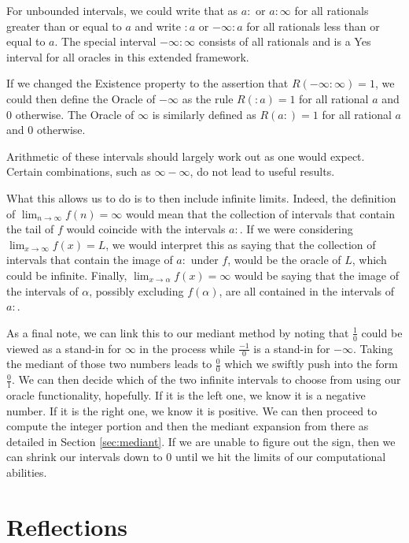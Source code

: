 \documentclass[12pt]{article}
\theoremstyle{remark}
\begin{document}
For unbounded intervals, we could write that as $a:$ or $a:\infty$ for all rationals greater than or equal to $a$ and write $:a$ or $-\infty:a$ for all rationals less than or equal to $a$. The special interval $-\infty:\infty$ consists of all rationals and is a Yes interval for all oracles in this extended framework. 

If we changed the Existence property to the assertion that $R(-\infty:\infty)=1$, we could then define the Oracle of $-\infty$ as the rule $R(:a) = 1$ for all rational $a$ and 0 otherwise. The Oracle of $\infty$ is similarly defined as $R(a:)=1$  for all rational $a$ and 0 otherwise. 

Arithmetic of these intervals should largely work out as one would expect. Certain combinations, such as $\infty-\infty$, do not lead to useful results. 

What this allows us to do is to then include infinite limits. Indeed, the definition of $\lim_{n\to \infty} f(n) = \infty$ would mean that the collection of intervals that contain the tail of $f$ would coincide with the intervals $a:$. If we were considering $\lim_{x \to \infty} f(x) = L$, we would interpret this as saying that the collection of intervals that contain the image of $a:$ under $f$, would be the oracle of $L$, which could be infinite.  Finally, $\lim_{x \to \alpha} f(x) = \infty$ would be saying that the image of the intervals of $\alpha$, possibly excluding $f(\alpha)$, are all contained in the intervals of $a:$. 

As a final note, we can link this to our mediant method by noting that $\frac{1}{0}$ could be viewed as a stand-in for $\infty$ in the process while $\frac{-1}{0}$ is a stand-in for $-\infty$. Taking the mediant of those two numbers leads to $\frac{0}{0}$ which we swiftly push into the form $\frac{0}{1}$. We can then decide which of the two infinite intervals to choose from using our oracle functionality, hopefully. If it is the left one, we know it is a negative number. If it is the right one, we know it is positive. We can then proceed to compute the integer portion and then the mediant expansion from there as detailed in Section \ref{sec:mediant}. If we are unable to figure out the sign, then we can shrink our intervals down to $0$ until we hit the limits of our computational abilities. 

\section{Reflections}
\end{document}
